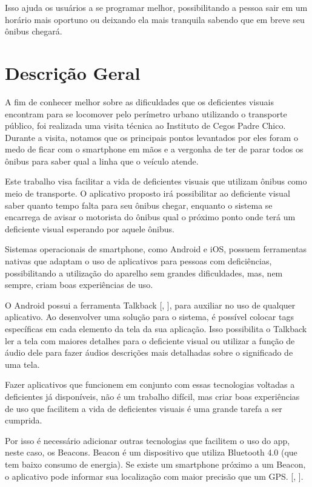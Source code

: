 \documentclass[
	12pt,				%
	oneside,			%
	a4paper,			%
	brazil				%
]{abntex2}
\newcommand{\citecustom}[1]{[\citeauthoronline{#1}, \citeyear{#1}]}
\begin{document}
Isso ajuda os usuários a se programar melhor, possibilitando a pessoa sair em um horário mais oportuno ou deixando ela mais tranquila sabendo que em breve seu ônibus chegará.

\section{Descrição Geral}

A fim de conhecer melhor sobre as dificuldades que os deficientes visuais encontram para se locomover pelo perímetro urbano utilizando o transporte público, foi realizada uma visita técnica ao Instituto de Cegos Padre Chico. Durante a visita, notamos que os principais pontos levantados por eles foram o medo de ficar com o smartphone em mãos e a vergonha de ter de parar todos os ônibus para saber qual a linha que o veículo atende.

Este trabalho visa facilitar a vida de deficientes visuais que utilizam ônibus como meio de transporte. O aplicativo proposto irá possibilitar ao deficiente visual saber quanto tempo falta para seu ônibus chegar, enquanto o sistema se encarrega de avisar o motorista do ônibus qual o próximo ponto onde terá um deficiente visual esperando por aquele ônibus.

Sistemas operacionais de smartphone, como Android e iOS, possuem ferramentas nativas que adaptam o uso de aplicativos para pessoas com deficiências, possibilitando a utilização do aparelho sem grandes dificuldades, mas, nem sempre, criam boas experiências de uso. 

O Android possui a ferramenta Talkback \citecustom{talkback}, para auxiliar no uso de qualquer aplicativo. Ao desenvolver uma solução para o sistema, é possível colocar tags específicas em cada elemento da tela da sua aplicação. Isso possibilita o Talkback ler a tela com maiores detalhes para o deficiente visual ou utilizar a função de áudio dele para fazer áudios descrições mais detalhadas sobre o significado de uma tela.

Fazer aplicativos que funcionem em conjunto com essas tecnologias voltadas a deficientes já disponíveis, não é um trabalho difícil, mas criar boas experiências de uso que facilitem a vida de deficientes visuais é uma grande tarefa a ser cumprida.

Por isso é necessário adicionar outras tecnologias que facilitem o uso do app, neste caso, os Beacons. Beacon é um dispositivo que utiliza Bluetooth 4.0 (que tem baixo consumo de energia). Se existe um smartphone próximo a um Beacon, o aplicativo pode informar sua localização com maior precisão que um GPS. \citecustom{beacon}.
\end{document}
